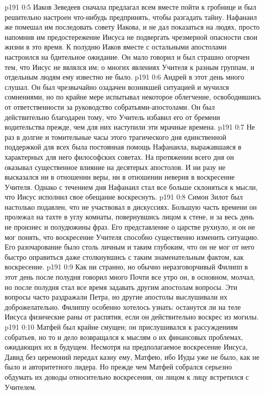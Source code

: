 \vs p191 0:5 Иаков Зеведеев сначала предлагал всем вместе пойти к гробнице и был решительно настроен что\hyp{}нибудь предпринять, чтобы разгадать тайну. Нафанаил же помешал им последовать совету Иакова, и не дал показаться на людях, просто напомнив им предостережение Иисуса не подвергать чрезмерной опасности свои жизни в это время. К полудню Иаков вместе с остальными апостолами настроился на бдительное ожидание. Он мало говорил и был страшно огорчен тем, что Иисус не являлся им; о многих явлениях Учителя к разным группам, и отдельным людям ему известно не было.
\vs p191 0:6 Андрей в этот день много слушал. Он был чрезвычайно озадачен возникшей ситуацией и мучился сомнениями, но по крайне мере испытывал некоторое облегчение, освободившись от ответственности за руководство собратьями\hyp{}апостолами. Он был действительно благодарен тому, что Учитель избавил его от бремени водительства прежде, чем для них наступили эти мрачные времена.
\vs p191 0:7 Не раз в долгие и томительные часы этого трагического дня единственной поддержкой для всех была постоянная помощь Нафанаила, выражавшаяся в характерных для него философских советах. На протяжении всего дня он оказывал существенное влияние на десятерых апостолов. И ни разу не высказался ни в отношении веры, ни в отношении неверия в воскресение Учителя. Однако с течением дня Нафанаил стал все больше склоняться к мысли, что Иисус исполнил свое обещание воскреснуть.
\vs p191 0:8 Симон Зилот был настолько подавлен, что не участвовал в дискуссиях. Большую часть времени он пролежал на тахте в углу комнаты, повернувшись лицом к стене, и за весь день не произнес и полудюжины фраз. Его представление о царстве рухнуло, и он не мог понять, что воскресение Учителя способно существенно изменить ситуацию. Его разочарование было столь личным и таким глубоким, что он не мог от него быстро оправиться даже столкнувшись с таким знаменательным фактом, как воскресение.
\vs p191 0:9 Как ни странно, но обычно неразговорчивый Филипп в этот день после полудня говорил много Почти все утро он, в основном, молчал, но после полудня стал все время задавать другим апостолам вопросы. Эти вопросы часто раздражали Петра, но другие апостолы выслушивали их доброжелательно. Филиппу особенно хотелось узнать: останутся ли на теле Иисуса физические раны от распятия, если он действительно воскрес из могилы.
\vs p191 0:10 Матфей был крайне смущен; он прислушивался к рассуждениям собратьев, но то и дело возвращался к мыслям о их финансовых проблемах, ожидающих их в будущем. Несмотря на предполагаемое воскресение Иисуса, Давид без церемоний передал казну ему, Матфею, ибо Иуды уже не было, как не было и авторитетного лидера. Но прежде чем Матфей собрался серьезно обдумать их доводы относительно воскресения, он лицом к лицу встретился с Учителем.
